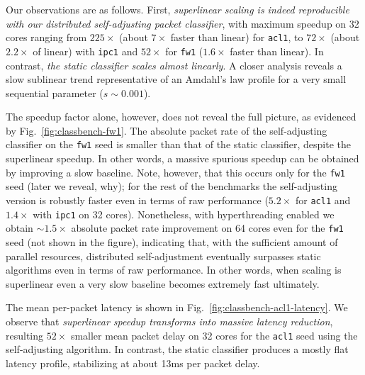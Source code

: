 Our observations are as follows. First, \emph{superlinear scaling is indeed reproducible with our distributed self-adjusting packet classifier}, with maximum speedup on 32 cores ranging from $225\times$ (about $7\times$ faster than linear) for \texttt{acl1}, to $72\times$ (about $2.2\times$ of linear) with \texttt{ipc1} and $52\times$ for \texttt{fw1} ($1.6\times$ faster than linear). In contrast, \emph{the static \nftables classifier scales almost linearly}. A closer analysis reveals a slow sublinear trend representative of an Amdahl's law profile for a very small sequential parameter ($s\sim 0.001$).

The speedup factor alone, however, does not reveal the full picture, as evidenced by Fig.~\ref{fig:classbench-fw1}. The absolute packet rate of the self-adjusting classifier on the \texttt{fw1} seed is smaller than that of the static classifier, despite the superlinear speedup. In other words, a massive spurious speedup can be obtained by improving a slow baseline.  Note, however, that this occurs only for the \texttt{fw1} seed (later we reveal, why); for the rest of the benchmarks the self-adjusting version is robustly faster even in terms of raw performance ($5.2\times$ for \texttt{acl1} and $1.4\times$ with \texttt{ipc1} on 32 cores). Nonetheless, with hyperthreading enabled we obtain $\sim\!1.5\times$ absolute packet rate improvement on 64 cores even for the \texttt{fw1} seed (not shown in the figure), indicating that, with the sufficient amount of parallel resources, distributed self-adjustment eventually surpasses static algorithms even in terms of raw performance. In other words, when scaling is superlinear even a very slow baseline becomes extremely fast ultimately.

The mean per-packet latency is shown in Fig.~\ref{fig:classbench-acl1-latency}. We observe that \emph{superlinear speedup transforms into massive latency reduction}, resulting $52\times$ smaller mean packet delay on 32 cores for the \texttt{acl1} seed using the self-adjusting algorithm. In contrast, the static \nftables classifier produces a mostly flat latency profile, stabilizing at about 13ms per packet delay.

